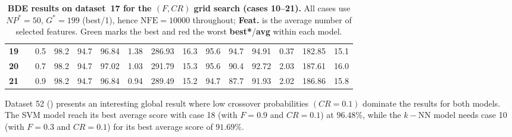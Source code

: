 \documentclass[12pt, openany]{article}
\begin{document}
\begin{table}[H]
{\begin{tabular}{|c c c | c c c c c c | c c c c c c |}
        \textbf{19} &  & 0.5 & 98.2 & 94.7 & 96.84 & 1.38 & 286.93 & 16.3 & \cellcolor{best}95.6 & 94.7 & \cellcolor{best}94.91 & 0.37 & 182.85 & 15.1 \\
        \textbf{20} &  & 0.7 & 98.2 & 94.7 & 97.02 & 1.03 & 291.79 & 15.3 & \cellcolor{best}95.6 & 90.4 & 92.72 & 2.03 & 187.61 & 16.0 \\
        \textbf{21} &  & 0.9 & 98.2 & 94.7 & 96.84 & 0.94 & 289.49 & 15.2 & \cellcolor{worst}94.7 & 87.7 & 91.93 & 2.02 & 186.86 & 15.8 \\
        \hline
    \end{tabular}
    }
    \caption{\textbf{BDE results on dataset~17 for the $(F, CR)$ grid search (cases 10--21).} All cases use $NP^{*}{=}50$, $G^{*}{=}199$ (best/1), hence $\mathrm{NFE}=10000$ throughout; \textbf{Feat.} is the average number of selected features. Green marks the best and red the worst \textbf{best*}/\textbf{avg} within each model.}
    \label{tab:results_BDE_FCR_d17}
\end{table}

Dataset 52 () presents an interesting global result where low crossover probabilities $(CR=0.1)$ dominate the results for both models. The SVM model reach its best average score with case 18 (with $F=0.9$ and $CR=0.1$) at $96.48\%$, while the $k-$NN model needs case 10 (with $F=0.3$ and $CR=0.1$) for its best average score of $91.69\%$.
\end{document}
